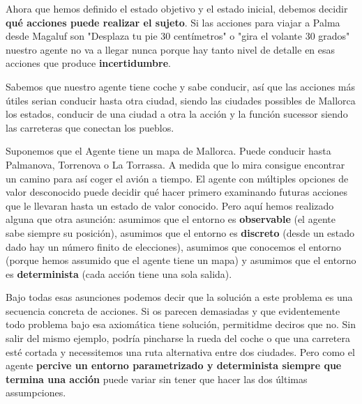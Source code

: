 \documentclass[12pt,a4paper,catalan, leqno]{article} %
\theoremstyle{definition}
\begin{document}
\vspace{2mm}
\noindent{}
\vspace{1mm}

Ahora que hemos definido el estado objetivo y el estado inicial, debemos decidir \textbf{qué acciones puede realizar el sujeto}. Si las acciones para viajar a Palma desde Magaluf son "Desplaza tu pie 30 centímetros" o "gira el volante 30 grados" nuestro agente no va a llegar nunca porque hay tanto nivel de detalle en esas acciones que produce \textbf{incertidumbre}.

Sabemos que nuestro agente tiene coche y sabe conducir, así que las acciones más útiles serian conducir hasta otra ciudad, siendo las ciudades possibles de Mallorca los estados, conducir de una ciudad a otra la acción y la función sucessor siendo las carreteras que conectan los pueblos.

\vspace{2mm}
\noindent{}
\vspace{1mm}

Suponemos que el Agente tiene un mapa de Mallorca. Puede conducir hasta Palmanova, Torrenova o La Torrassa. A medida que lo mira consigue encontrar un camino para así coger el avión a tiempo. El agente con múltiples opciones de valor desconocido puede decidir qué hacer primero examinando futuras acciones que le llevaran hasta un estado de valor conocido. Pero aquí hemos realizado alguna que otra asunción: asumimos que el entorno es \textbf{observable} (el agente sabe siempre su posición), asumimos que el entorno es \textbf{discreto} (desde un estado dado hay un número finito de elecciones), asumimos que conocemos el entorno (porque hemos assumido que el agente tiene un mapa) y asumimos que el entorno es \textbf{determinista} (cada acción tiene una sola salida).

Bajo todas esas asunciones podemos decir que la solución a este problema es una secuencia concreta de acciones. Si os parecen demasiadas y que evidentemente todo problema bajo esa axiomática tiene solución, permitidme deciros que no. Sin salir del mismo ejemplo, podría pincharse la rueda del coche o que una carretera esté cortada y necessitemos una ruta alternativa entre dos ciudades. Pero como el agente \textbf{percive un entorno parametrizado y determinista siempre que termina una acción} puede variar sin tener que hacer las dos últimas assumpciones.
\end{document}
